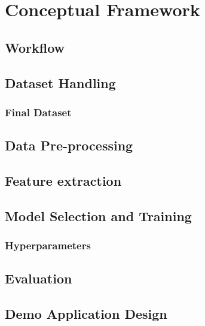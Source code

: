\chapter{Conceptual Framework}

\section{Workflow}

\section{Dataset Handling}
\subsection{Final Dataset}

\section{Data Pre-processing}

\section{Feature extraction}

\section{Model Selection and Training}
\subsection{Hyperparameters}

\section{Evaluation}

\section{Demo Application Design}
